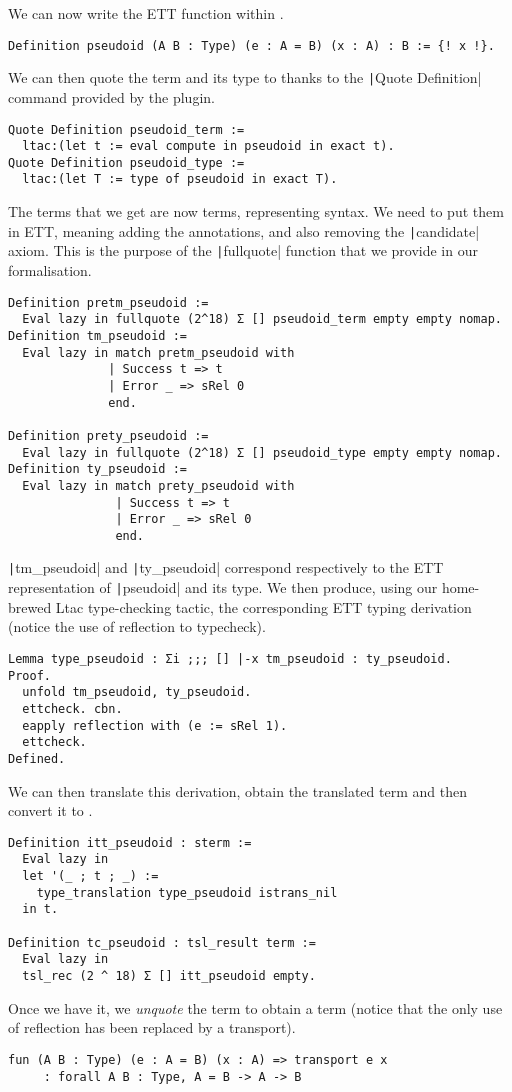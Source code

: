 We can now write the ETT function within \Coq.
%
\begin{verbatim}
Definition pseudoid (A B : Type) (e : A = B) (x : A) : B := {! x !}.
\end{verbatim}
%
We can then quote the term and its type to \TemplateCoq thanks to the
\texttt|Quote Definition| command provided by the plugin.
%
\begin{verbatim}
Quote Definition pseudoid_term :=
  ltac:(let t := eval compute in pseudoid in exact t).
Quote Definition pseudoid_type :=
  ltac:(let T := type of pseudoid in exact T).
\end{verbatim}
%
The terms that we get are now \TemplateCoq terms, representing \Coq syntax.
We need to put them in ETT, meaning adding the annotations, and also removing
the \texttt|candidate| axiom.
This is the purpose of the \texttt|fullquote| function that we provide
in our formalisation.
%
\begin{verbatim}
Definition pretm_pseudoid :=
  Eval lazy in fullquote (2^18) Σ [] pseudoid_term empty empty nomap.
Definition tm_pseudoid :=
  Eval lazy in match pretm_pseudoid with
              | Success t => t
              | Error _ => sRel 0
              end.

Definition prety_pseudoid :=
  Eval lazy in fullquote (2^18) Σ [] pseudoid_type empty empty nomap.
Definition ty_pseudoid :=
  Eval lazy in match prety_pseudoid with
               | Success t => t
               | Error _ => sRel 0
               end.
\end{verbatim}
%
\texttt|tm_pseudoid| and \texttt|ty_pseudoid| correspond
respectively to the ETT representation of \texttt|pseudoid| and its
type.
We then produce, using our home-brewed Ltac type-checking tactic, the
corresponding ETT typing derivation (notice the use of reflection to typecheck).
%
\begin{verbatim}
Lemma type_pseudoid : Σi ;;; [] |-x tm_pseudoid : ty_pseudoid.
Proof.
  unfold tm_pseudoid, ty_pseudoid.
  ettcheck. cbn.
  eapply reflection with (e := sRel 1).
  ettcheck.
Defined.
\end{verbatim}
%
We can then translate this derivation, obtain the translated term and then
convert it to \TemplateCoq.
%
\begin{verbatim}
Definition itt_pseudoid : sterm :=
  Eval lazy in
  let '(_ ; t ; _) :=
    type_translation type_pseudoid istrans_nil
  in t.

Definition tc_pseudoid : tsl_result term :=
  Eval lazy in
  tsl_rec (2 ^ 18) Σ [] itt_pseudoid empty.
\end{verbatim}
%
Once we have it, we \emph{unquote} the term to obtain a \Coq term
(notice that the only use of reflection has been replaced by a transport).
%
\begin{verbatim}
fun (A B : Type) (e : A = B) (x : A) => transport e x
     : forall A B : Type, A = B -> A -> B
\end{verbatim}

